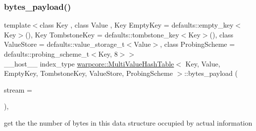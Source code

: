 \subsubsection{\texorpdfstring{bytes\+\_\+payload()}{bytes\_payload()}}
{\footnotesize\ttfamily template$<$class Key , class Value , Key Empty\+Key = defaults\+::empty\+\_\+key$<$\+Key$>$(), Key Tombstone\+Key = defaults\+::tombstone\+\_\+key$<$\+Key$>$(), class Value\+Store  = defaults\+::value\+\_\+storage\+\_\+t$<$\+Value$>$, class Probing\+Scheme  = defaults\+::probing\+\_\+scheme\+\_\+t$<$\+Key, 8$>$$>$ \\
\+\_\+\+\_\+host\+\_\+\+\_\+ index\+\_\+type \hyperlink{classwarpcore_1_1MultiValueHashTable}{warpcore\+::\+Multi\+Value\+Hash\+Table}$<$ Key, Value, Empty\+Key, Tombstone\+Key, Value\+Store, Probing\+Scheme $>$\+::bytes\+\_\+payload (\begin{DoxyParamCaption}\item[{cuda\+Stream\+\_\+t}]{stream = {} }\end{DoxyParamCaption})\hspace{0.3cm}{\ttfamily [inline]}, {\ttfamily [noexcept]}}



get the the number of bytes in this data structure occupied by actual information 



